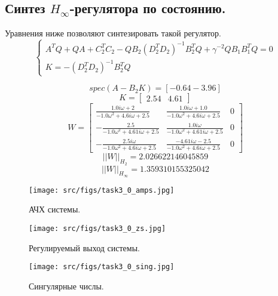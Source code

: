 \subsection{Синтез \(H_\infty\)-регулятора по состоянию.}
Уравнения ниже позволяют синтезировать такой регулятор.
\begin{equation}
    \begin{cases}
        A^TQ + QA +C_2^TC_2 - QB_2(D_2^TD_2)^{-1}B_2^TQ + \gamma^{-2}QB_1B_1^TQ=0 \\
        K = -(D_2^TD_2)^{-1}B_2^TQ
    \end{cases}
\end{equation}


\[spec(A-B_2 K) = [-0.64 -3.96]\]
\[K = \begin{bmatrix}
  2.54 &  4.61
\end{bmatrix}\]
\[W = \left[\begin{matrix}\frac{1.0 i \omega + 2}{- 1.0 \omega^{2} + 4.6 i \omega + 2.5} & \frac{1.0 i \omega + 1.0}{- 1.0 \omega^{2} + 4.6 i \omega + 2.5} & 0\\- \frac{2.5}{- 1.0 \omega^{2} + 4.61 i \omega + 2.5} & \frac{1.0 i \omega}{- 1.0 \omega^{2} + 4.61 i \omega + 2.5} & 0\\- \frac{2.5 i \omega}{- 1.0 \omega^{2} + 4.6 i \omega + 2.5} & \frac{- 4.61 i \omega - 2.5}{- 1.0 \omega^{2} + 4.6 i \omega + 2.5} & 0\end{matrix}\right]\]
\[||W||_{H_2} = 2.026622146045859\]
\[||W||_{H_\infty} = 1.359310155325042 \]

\begin{figure}[ht!]
    \centering
    \texttt{[image: src/figs/task3\_0\_amps.jpg]}
    \caption{АЧХ системы.}
    \label{fig:task3_0_amps}
  \end{figure}
  
  \begin{figure}[ht!]
    \centering
    \texttt{[image: src/figs/task3\_0\_zs.jpg]}
    \caption{Регулируемый выход системы.}
    \label{fig:task3_0_zs}
  \end{figure}
  
  \begin{figure}[ht!]
    \centering
    \texttt{[image: src/figs/task3\_0\_sing.jpg]}
    \caption{Сингулярные числы.}
    \label{fig:task3_0_sing}
  \end{figure}

\FloatBarrier

